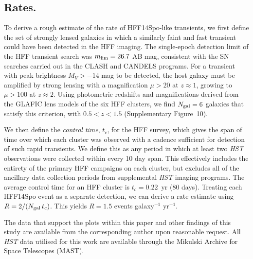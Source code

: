 \documentclass{article}
\def\HST{{\it HST}\xspace}
\def\spock{HFF14Spo\xspace}
\begin{document}
\subsection{Rates.}\label{sec:RatesMethods}

To derive a rough estimate of the rate of \spock-like transients, we
first define the set of strongly lensed galaxies in which a similarly
faint and fast transient could have been detected in the HFF
imaging. The single-epoch detection limit of the HFF transient search
was $m_{\rm lim}=26.7$ AB mag, consistent with the SN searches carried
out in the CLASH and CANDELS programs\cite{Graur:2014,Rodney:2014}.
For a transient with peak brightness $M_{V}>-14$ mag to be detected,
the host galaxy must be amplified by strong lensing with a
magnification $\mu>20$ at $z\approx1$, growing to $\mu>100$ at $z\approx2$.
Using photometric redshifts and magnifications derived from the GLAFIC
lens models of the six HFF clusters, we find $N_{\rm gal}=6$ galaxies
that satisfy this criterion, with $0.5<z<1.5$ (Supplementary
Figure~10).

We then define the {\it control time}, $t_{c}$, for the HFF survey,
which gives the span of time over which each cluster was observed with
a cadence sufficient for detection of such rapid transients.  We
define this as any period in which at least two \HST observations were
collected within every 10 day span. This effectively includes the
entirety of the primary HFF campaigns on each cluster, but excludes
all of the ancillary data collection periods from supplemental \HST
imaging programs. The average control time for an HFF cluster is
$t_{c} = 0.22$~yr (80 days).  Treating each \spock event as a
separate detection, we can derive a rate estimate using $R = 2 /
(N_{\rm gal}\,t_c)$.  This yields $R=1.5$ events galaxy$^{-1}$
yr$^{-1}$.   


\bigskip
The data that support the plots within this paper and other findings
of this study are available from the corresponding author upon
reasonable request.  All \HST data utilised for this work are
available through the Mikulski Archive for Space Telescopes (MAST).


\clearpage
\end{document}
